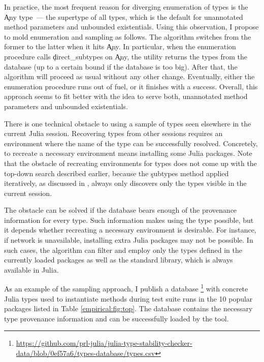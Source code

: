 \begin{enumerate}
In practice, the most frequent reason for diverging enumeration of types
is the \c{Any} type~--- the supertype of all types, which is the default for
unannotated method parameters and unbounded existentials. Using this
observation, I propose to mold enumeration and sampling as follows. The
algorithm switches from the former to the latter when it hits \c{Any}.
In particular, when the enumeration procedure calls
\c{direct\_subtypes} on \c{Any}, the utility returns the types from the database
(up to a certain bound if the database is too big).
After that, the algorithm will proceed as usual without any other change.
Eventually, either the enumeration procedure runs out
of fuel, or it finishes with a success. Overall, this approach seems to fit better
with the idea to serve both, unannotated method parameters and unbounded
existentials.

\end{enumerate}

There is one technical obstacle to using a sample of types seen elsewhere
in the current Julia session. Recovering types from
other sessions requires an environment where the name of the type can be
successfully resolved. Concretely, to recreate a necessary environment means
installing some Julia packages.
Note that the obstacle of recreating environments for types does not come up
with the top-down search described earlier, because the \c{subtypes} method
applied iteratively, as discussed in , always only
discovers only the types visible in the current session.

The obstacle can be solved if the database bears enough
of the provenance information for every type. Such information makes using the
type possible, but %
it depends whether recreating a necessary environment is desirable.
For instance, if network is unavailable, installing extra Julia packages 
may not be possible.
In such cases, the algorithm can filter and
employ only the types defined in the currently loaded packages as well as 
the standard library, which is always available in Julia.

As an example of the sampling approach, I publish a database%
\footnote{%
  \url{https://github.com/prl-julia/julia-type-stability-checker-data/blob/0ef57a6/types-database/types.csv}}
with concrete Julia types used to instantiate methods during test suite runs in
the 10 popular packages listed in Table \ref{empirical:fig:top}. The database
contains the necessary type provenance information and can be successfully
loaded by the tool.

